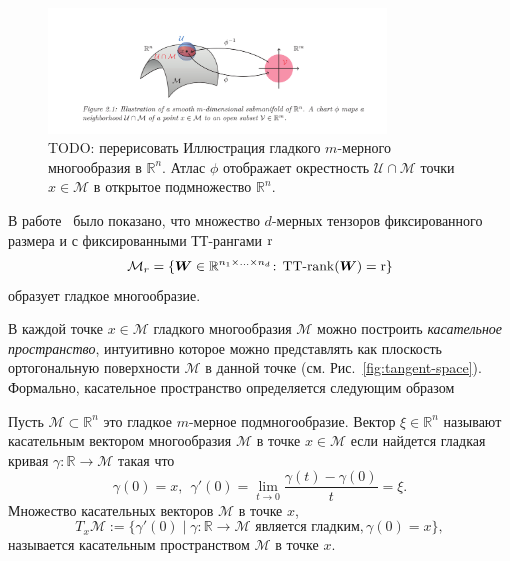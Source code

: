 \begin{figure}[t]
\begin{center}
  \includegraphics[width=0.8\textwidth]{images/manifold_def.png}
  \caption{\alert{TODO: перерисовать} Иллюстрация гладкого $m$-мерного многообразия в $\mathbb{R}^n$. Атлас $\phi$ отображает окрестность  $\mathcal{U} \cap \mathcal{M}$ точки $x \in \mathcal{M}$ в открытое подмножество $\mathbb{R}^n$. \label{fig:manifold-def}}
  \end{center}
\end{figure}

В работе~\cite{holtz2012manifolds} было показано, что множество $d$-мерных тензоров фиксированного размера и с фиксированными ТТ-рангами $\operatorname{r}$
\begin{equation*}
\mathcal{M}_r = \{\boldsymbol{W} \in \mathbb{R}^{n_1 \times  \ldots \times n_d}\!:\, \operatorname{TT-rank}(\boldsymbol{W})=\operatorname{r}\}
\end{equation*}
образует гладкое многообразие.

В каждой точке $x \in \mathcal{M}$ гладкого многообразия $\mathcal{M}$ можно построить \emph{касательное пространство}, интуитивно которое можно представлять как плоскость ортогональную поверхности $\mathcal{M}$ в данной точке (см. Рис.~\ref{fig:tangent-space}). Формально, касательное пространство определяется следующим образом
\begin{definition}
	\cite{RS13, Def. 1.21} Пусть $\mathcal{M} \subset \mathbb{R}^n$ это гладкое $m$-мерное подмногообразие. Вектор $\xi \in \mathbb{R}^n$ называют касательным вектором многообразия $\mathcal{M}$ в точке $x \in \mathcal{M}$ если найдется гладкая кривая $\gamma: \mathbb{R} \to \mathcal{M}$ такая что
\[
\gamma(0) = x, ~~ \gamma'(0) = \lim_{t \to 0} \frac{\gamma(t) - \gamma(0)}{t} = \xi.
\]
Множество касательных векторов $\mathcal{M}$ в точке $x$,
\[
T_x \mathcal{M} := \{\gamma'(0) \mid \gamma : \mathbb{R} \to \mathcal{M} \text{ является гладким}, \gamma(0) = x\},
\]
называется касательным пространством $\mathcal{M}$ в точке $x$.
\end{definition}

